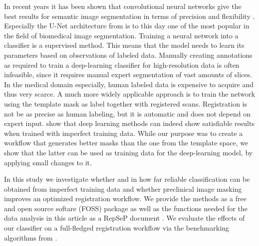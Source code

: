In recent years it has been shown that convolutional neural networks give the best results for semantic image segmentation in terms of precision and flexibility \cite{geng_survey_2018}.
Especially the U-Net architecture from \cite{ronneberger_u-net:_2015} is to this day one of the most popular in the field of biomedical image segmentation.
Training a neural network into a classifier is a supervised method.
This means that the model needs to learn its parameters based on observations of labeled data.
Manually creating annotations as required to train a deep-learning classifier for high-resolution data is often infeasible, since it requires manual expert segmentation of vast amounts of slices.
In the medical domain especially, human labeled data is expensive to acquire and thus very scarce.
A much more widely applicable approach is to train the network using the template mask as label together with registered scans.
Registration is not be as precise as human labeling, but it is automatic and does not depend on expert input.
\cite{imperfect_datasets, imperferct_segmentaion_labels} show that deep learning methods can indeed show satisfiable results when trained with imperfect training data.
While our purpose was to create a workflow that generates better masks than the one from the template space, we show that the latter can be used as training data for the deep-learning model, by applying small changes to it.


In this study we investigate whether and in how far reliable classification can be obtained from imperfect training data and whether preclinical image masking improves an optimized registration workflow.
We provide the methods as a free and open source softare (FOSS) package \cite{mlebe} as well as the functions needed for the data analysis in this article as a RepSeP document \cite{repsep}.
We evaluate the effects of our classifier on a full-fledged registration workflow via the benchmarking algorithms from \cite{ioanas_optimized_2019}.